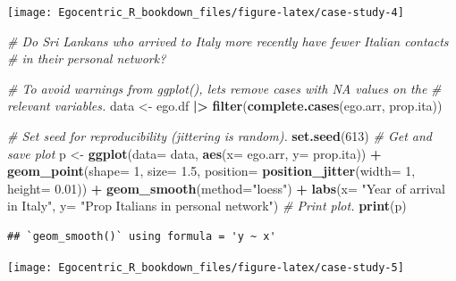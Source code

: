 \documentclass[
]{book}
\newenvironment{Shaded}{\begin{snugshade}}{\end{snugshade}}
\newcommand{\AttributeTok}[1]{\textcolor[rgb]{0.13,0.29,0.53}{#1}}
\newcommand{\CommentTok}[1]{\textcolor[rgb]{0.56,0.35,0.01}{\textit{#1}}}
\newcommand{\DecValTok}[1]{\textcolor[rgb]{0.00,0.00,0.81}{#1}}
\newcommand{\FloatTok}[1]{\textcolor[rgb]{0.00,0.00,0.81}{#1}}
\newcommand{\FunctionTok}[1]{\textcolor[rgb]{0.13,0.29,0.53}{\textbf{#1}}}
\newcommand{\NormalTok}[1]{#1}
\newcommand{\OtherTok}[1]{\textcolor[rgb]{0.56,0.35,0.01}{#1}}
\newcommand{\SpecialCharTok}[1]{\textcolor[rgb]{0.81,0.36,0.00}{\textbf{#1}}}
\newcommand{\StringTok}[1]{\textcolor[rgb]{0.31,0.60,0.02}{#1}}
\begin{document}
\texttt{[image: Egocentric\_R\_bookdown\_files/figure-latex/case-study-4]}

\begin{Shaded}
\begin{Highlighting}[]
\CommentTok{\# Do Sri Lankans who arrived to Italy more recently have fewer Italian contacts}
\CommentTok{\# in their personal network?}

\CommentTok{\# To avoid warnings from ggplot(), let\textquotesingle{}s remove cases with NA values on the}
\CommentTok{\# relevant variables.}
\NormalTok{data }\OtherTok{\textless{}{-}}\NormalTok{ ego.df }\SpecialCharTok{|\textgreater{}} 
  \FunctionTok{filter}\NormalTok{(}\FunctionTok{complete.cases}\NormalTok{(ego.arr, prop.ita))}

\CommentTok{\# Set seed for reproducibility (jittering is random).}
\FunctionTok{set.seed}\NormalTok{(}\DecValTok{613}\NormalTok{)}
\CommentTok{\# Get and save plot}
\NormalTok{p }\OtherTok{\textless{}{-}} \FunctionTok{ggplot}\NormalTok{(}\AttributeTok{data=}\NormalTok{ data, }\FunctionTok{aes}\NormalTok{(}\AttributeTok{x=}\NormalTok{ ego.arr, }\AttributeTok{y=}\NormalTok{ prop.ita)) }\SpecialCharTok{+} 
  \FunctionTok{geom\_point}\NormalTok{(}\AttributeTok{shape=} \DecValTok{1}\NormalTok{, }\AttributeTok{size=} \FloatTok{1.5}\NormalTok{, }\AttributeTok{position=} \FunctionTok{position\_jitter}\NormalTok{(}\AttributeTok{width=} \DecValTok{1}\NormalTok{, }\AttributeTok{height=} \FloatTok{0.01}\NormalTok{)) }\SpecialCharTok{+} 
  \FunctionTok{geom\_smooth}\NormalTok{(}\AttributeTok{method=}\StringTok{"loess"}\NormalTok{) }\SpecialCharTok{+} 
  \FunctionTok{labs}\NormalTok{(}\AttributeTok{x=} \StringTok{"Year of arrival in Italy"}\NormalTok{, }\AttributeTok{y=} \StringTok{"Prop Italians in personal network"}\NormalTok{)}
\CommentTok{\# Print plot.}
\FunctionTok{print}\NormalTok{(p)}
\end{Highlighting}
\end{Shaded}

\begin{verbatim}
## `geom_smooth()` using formula = 'y ~ x'
\end{verbatim}

\texttt{[image: Egocentric\_R\_bookdown\_files/figure-latex/case-study-5]}
\end{document}
